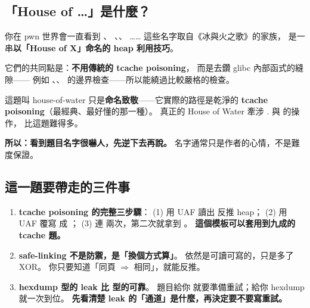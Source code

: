 \subsection{「House of \dots」是什麼？}

你在 pwn 世界會一直看到 、
、、
…… 這些名字取自《冰與火之歌》的家族，
是一串\textbf{以「House of X」命名的 heap 利用技巧}。

它們的共同點是：\textbf{不用傳統的 tcache poisoning}，
而是去鑽 glibc 內部函式的縫隙——
例如 、、
 的邊界檢查——所以能繞過比較嚴格的檢查。

\begin{keybox}
這題叫 house-of-water 只是\textbf{命名致敬}——它實際的路徑是乾淨的
\textbf{tcache poisoning}（最經典、最好懂的那一種）。
真正的 House of Water 牽涉 . 與  的操作，
比這題難得多。

\textbf{所以：看到題目名字很嚇人，先逆下去再說。}
名字通常只是作者的心情，不是難度保證。
\end{keybox}

\subsection{這一題要帶走的三件事}

\begin{enumerate}[leftmargin=1.5em,itemsep=3pt]
  \item \textbf{tcache poisoning 的完整三步驟}：
        (1) 用 UAF 讀出  反推 heap；
        (2) 用 UAF 覆寫  成 ；
        (3) 連  兩次，第二次就拿到 。
        \textbf{這個模板可以套用到九成的 tcache 題。}
  \item \textbf{safe-linking 不是防禦，是「換個方式算」}。
         依然是可讀可寫的，只是多了 XOR。
        你只要知道「同頁 $\Rightarrow$  相同」，就能反推。
  \item \textbf{hexdump 型的 leak 比  型的可靠}。
        題目給你  就要準備重試；給你 hexdump 就一次到位。
        \textbf{先看清楚 leak 的「通道」是什麼，再決定要不要寫重試。}
\end{enumerate}

